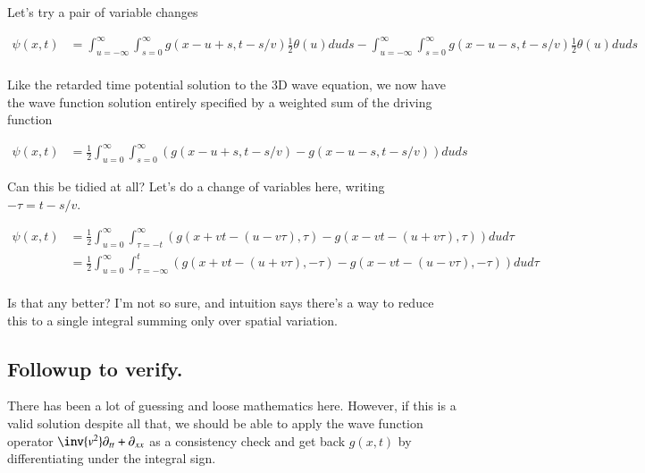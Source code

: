 Let's try a pair of variable changes

\begin{align*}
{\psi}(x, t)
&=
\int_{u=-\infty}^\infty
\int_{s= 0}^\infty
{g}(x-u+s, t-s/v)
\frac{1}{2} \theta(u ) 
du ds
-\int_{u=-\infty}^\infty
\int_{s= 0}^\infty
{g}(x-u -s, t-s/v)
\frac{1}{2} \theta(u) 
du ds \\
\end{align*}

Like the retarded time potential solution to the 3D wave equation, we now have the wave function solution entirely specified by a
weighted sum of the driving function

\begin{align}
{\psi}(x, t)
&=
\frac{1}{2}
\int_{u = 0}^\infty
\int_{s = 0}^\infty
\left( {g}(x-u+s, t-s/v) - {g}(x-u -s, t-s/v) \right)
du ds
\end{align}

Can this be tidied at all?  Let's do a change of variables here, writing $-\tau = t -s/v$.

%
%
% 
\begin{align*}
{\psi}(x, t)
&=
\frac{1}{2}
\int_{u = 0}^\infty
\int_{\tau = -t}^\infty
\left( {g}(x+vt -(u - v\tau), \tau) - {g}(x-v t -(u +v\tau), \tau) \right)
du d\tau \\
&=
\frac{1}{2}
\int_{u = 0}^\infty
\int_{\tau = -\infty}^{t}
\left( {g}(x+vt -(u + v\tau), -\tau) - {g}(x-v t -(u -v\tau), -\tau) \right)
du d\tau \\
\end{align*}

Is that any better?  I'm not so sure, and intuition says there's a way to reduce this to a single integral summing
only over spatial variation.

\subsection{Followup to verify. }

There has been a lot of guessing and loose mathematics here.  However, if this is a valid solution despite all that, we should be
able to apply the wave function operator $\inv{v^2} \partial_{tt} + \partial_{xx}$ as a 
consistency check and get back $g(x,t)$ by differentiating
under the integral sign.

